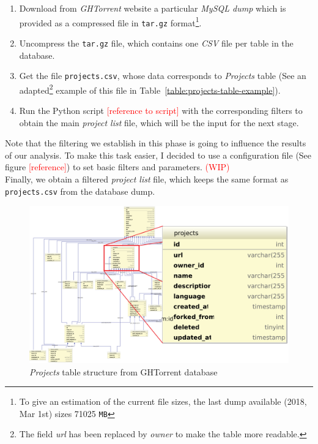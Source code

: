 \documentclass[a4paper, 12pt]{book}
\begin{document}
\begin{enumerate}
  \item Download from \emph{GHTorrent} website a particular \emph{MySQL dump} which is provided as a compressed file in \texttt{tar.gz}
        format\footnote{To give an estimation of the current file sizes, the last dump available (2018, Mar 1st) sizes 71025 \texttt{MB}}.
  \item Uncompress the \texttt{tar.gz} file, which contains one \emph{CSV} file per table in the database.
  \item Get the file \texttt{projects.csv}, whose data corresponds to \emph{Projects} table (See an adapted\footnote{The field \emph{url} has been replaced by \emph{owner} to make the table more readable.}
  example of this file in Table~\ref{table:projects-table-example}).
  \item Run the Python script \textcolor{red}{[reference to script]} with the corresponding filters to obtain the main
        \emph{project list} file, which will be the input for the next stage.
\end{enumerate}
Note that the filtering we establish in this phase is going to influence the results of our analysis. To make this task easier,
I decided to use a configuration file (See figure \textcolor{red}{[reference]}) to set basic filters and parameters. \textcolor{red}{(WIP)}\\
Finally, we obtain a filtered \emph{project list} file, which keeps the same format as \texttt{projects.csv} from the database dump.
\begin{figure}
  \centering
  \includegraphics[width=16cm, keepaspectratio]{img/ghtorrent-schema-detail}
  \caption{\textit{Projects} table structure from GHTorrent database}
  \label{fig:ghtorrent-schema-detail}
\end{figure}
\end{document}

